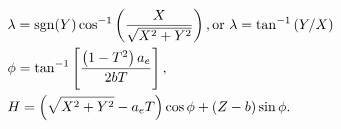 \documentclass[10pt]{article}
\begin{document}
\begin{align*}&  \lambda = \operatorname{sgn}(Y) \cos^{-1} \left( \frac{X}{\sqrt{ X^2 + Y^2 }} \right), 
{\rm or} \
\lambda = \tan^{-1} \left( Y / X \right)
\\
&  \phi = \tan^{-1} \left[ \frac{ \left( 1 - T^2 \right) a_e }{ 2 b T } \right], 
\\
&  H = \left( \sqrt{ X^2 + Y^2 } - a_e T \right) \cos \phi +  \left( Z - b \right) \sin \phi .\end{align*}
\end{document}
